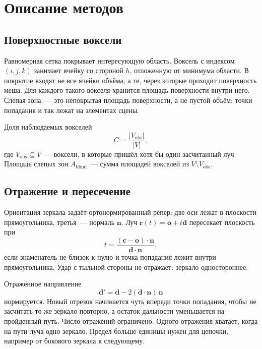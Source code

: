 \documentclass{misisarticle}
\begin{document}
\section{Описание методов}

\subsection{Поверхностные воксели}

Равномерная сетка покрывает интересующую область. Воксель с индексом \((i,j,k)\) занимает ячейку со стороной \(h\), отложенную от минимума области. В покрытие входят не все ячейки объёма, а те, через которые проходит поверхность меша. Для каждого такого вокселя хранится площадь поверхности внутри него. Слепая зона~--- это непокрытая площадь поверхности, а не пустой объём: точки попадания и так лежат на элементах сцены.

Доля наблюдаемых вокселей
\begin{equation}
  C = \frac{|V_{\mathrm{obs}}|}{|V|},
  \label{eq:coverage}
\end{equation}
где \(V_{\mathrm{obs}} \subseteq V\)~--- воксели, в которые пришёл хотя бы один засчитанный луч. Площадь слепых зон \(A_{\mathrm{blind}}\)~--- сумма площадей вокселей из \(V \setminus V_{\mathrm{obs}}\).

\subsection{Отражение и пересечение}

Ориентация зеркала задаёт ортонормированный репер: две оси лежат в плоскости прямоугольника, третья~--- нормаль \(\mathbf{n}\). Луч \(\mathbf{r}(t) = \mathbf{o} + t\mathbf{d}\) пересекает плоскость при
\begin{equation}
  t = \frac{(\mathbf{c} - \mathbf{o}) \cdot \mathbf{n}}{\mathbf{d} \cdot \mathbf{n}},
  \label{eq:plane}
\end{equation}
если знаменатель не близок к нулю и точка попадания лежит внутри прямоугольника. Удар с тыльной стороны не отражает: зеркало одностороннее.

Отражённое направление
\begin{equation}
  \mathbf{d}' = \mathbf{d} - 2(\mathbf{d} \cdot \mathbf{n})\,\mathbf{n}
  \label{eq:reflect}
\end{equation}
нормируется. Новый отрезок начинается чуть впереди точки попадания, чтобы не засчитать то же зеркало повторно, а остаток дальности уменьшается на пройденный путь. Число отражений ограничено. Одного отражения хватает, когда на пути луча одно зеркало. Предел больше единицы нужен для цепочки, например от бокового зеркала к следующему.
\end{document}
